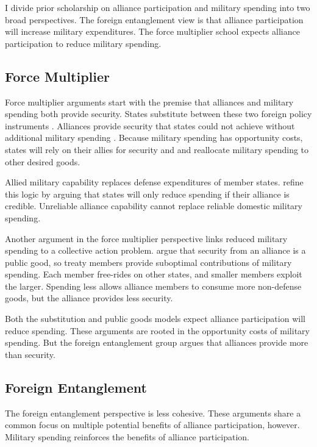 \documentclass[12pt]{article}
\begin{document}
I divide prior scholarship on alliance participation and military spending into two broad perspectives. 
The foreign entanglement view is that alliance participation will increase military expenditures.
The force multiplier school expects alliance participation to reduce military spending. 


\subsection{Force Multiplier} 


Force multiplier arguments start with the premise that alliances and military spending both provide security.
States substitute between these two foreign policy instruments \citep{MostStarr1989}.  
Alliances provide security that states could not achieve without additional military spending \citep{Morrow1993, Conybeare1994}. 
Because military spending has opportunity costs, states will rely on their allies for security and and reallocate military spending to other desired goods. 


Allied military capability replaces defense expenditures of member states. 
\citet{DigiuseppePoast2016} refine this logic by arguing that states will only reduce spending if their alliance is credible. 
Unreliable alliance capability cannot replace reliable domestic military spending. 


Another argument in the force multiplier perspective links reduced military spending to a collective action problem. 
\citet{OlsonZeckhauser1966} argue that security from an alliance is a public good, so treaty members provide suboptimal contributions of military spending. 
Each member free-rides on other states, and smaller members exploit the larger. 
Spending less allows alliance members to consume more non-defense goods, but the alliance provides less security. 


Both the substitution and public goods models expect alliance participation will reduce spending. 
These arguments are rooted in the opportunity costs of military spending. 
But the foreign entanglement group argues that alliances provide more than security. 


\subsection{Foreign Entanglement}


The foreign entanglement perspective is less cohesive.
These arguments share a common focus on multiple potential benefits of alliance participation, however. 
Military spending reinforces the benefits of alliance participation. 
\end{document}
